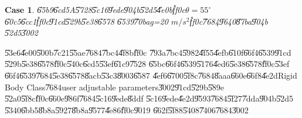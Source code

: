\documentclass[12pt,a4paper]{article}
\newtheorem{case}[theorem]{Case}
\begin{document}
\begin{case}
\U{65b9}\U{6cd5}A\U{5728}\U{5c16}\U{9ede}\U{904b}\U{52d5}\U{4e0b}\U{ff0c}$%
\theta =55^{\circ }$\U{60c5}\U{6cc1}\U{ff0c}\U{91cd}\U{529b}\U{5e38}\U{6578}%
\U{6539}\U{70ba}g=20 $m/s^{2}$\U{ff0c}\U{7684}\U{9640}\U{87ba}\U{904b}%
\U{52d5}\U{3002}
\end{case}

\U{53e6}\U{4e00}\U{500b}\U{7c21}\U{55ae}\U{7684}\U{7bc4}\U{4f8b}\U{ff0c}%
\U{793a}\U{7bc4}\U{5982}\U{4f55}\U{4efb}\U{610f}\U{66f4}\U{6539}\U{91cd}%
\U{529b}\U{5e38}\U{6578}\U{ff0c}\U{540c}\U{6cd5}\U{53ef}\U{61c9}\U{7528}%
\U{65bc}\U{66f4}\U{6539}\U{5176}\U{4ed6}\U{5e38}\U{6578}\U{ff0c}\U{53ef}%
\U{66f4}\U{6539}\U{7684}\U{5e38}\U{6578}\U{8acb}\U{53c3}\U{8003}\U{6587}%
\U{4ef6}\U{6700}\U{5f8c}\U{7684}\U{8aaa}\U{660e}\U{66f8}\U{4e2d}Rigid Body
Class\U{7684}user adjustable parameters\U{3002}\U{91cd}\U{529b}\U{589e}%
\U{52a0}\U{5f8c}\U{ff0c}\U{660e}\U{986f}\U{7684}\U{5c16}\U{9ede}\U{8ddf}%
\U{5c16}\U{9ede}\U{4e2d}\U{9593}\U{7684}\U{5f27}\U{7dda}\U{904b}\U{52d5}%
\U{5340}\U{6bb5}\U{8b8a}\U{5927}\U{8b8a}\U{9577}\U{4e86}\U{ff0c}\U{9019}%
\U{662f}\U{5f88}\U{5408}\U{7406}\U{7684}\U{3002}

%
\begin{center}

\end{center}%

\clearpage%
\end{document}
